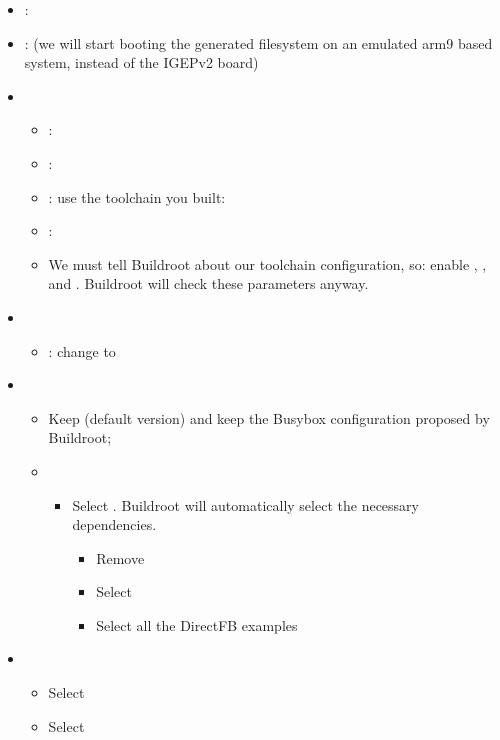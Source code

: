 \begin{itemize}
\item {}: 
\item {}:  (we will start booting
      the generated filesystem on an emulated arm9 based system,
      instead of the IGEPv2 board)
\item {}
  \begin{itemize}
  \item {}: 
  \item {}: 
  \item {}: use the toolchain you built:
  \item {}: 
  \item We must tell Buildroot about our toolchain configuration, so:
    enable , , and .
    Buildroot will check these parameters anyway.
  \end{itemize}
\item {}
  \begin{itemize}
  \item {}: change  to 
  \end{itemize}
\item {}
  \begin{itemize}
  \item Keep  (default version) and keep the Busybox
    configuration proposed by Buildroot;
  \item {}
    \begin{itemize}
    \item Select . Buildroot will automatically select the
      necessary dependencies.
    \begin{itemize}
         \item Remove 
         \item Select 
         \item Select all the DirectFB examples
     \end{itemize}
    \end{itemize}
  \end{itemize}
\item {}
  \begin{itemize}
  \item Select 
  \item Select 
  \end{itemize}
\end{itemize}

